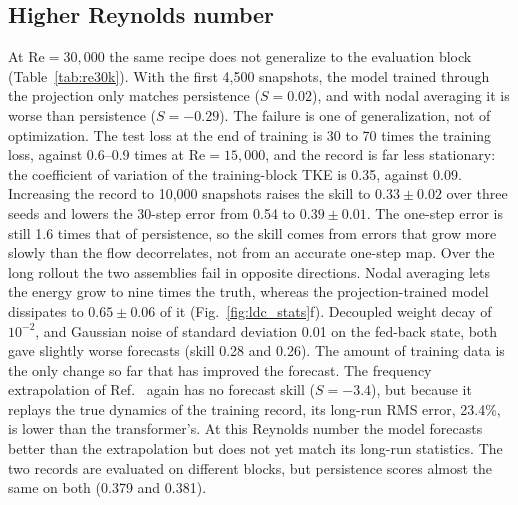 \documentclass[conf]{new-aiaa}
\newcommand{\Rey}{\mathrm{Re}}
\begin{document}
\subsection{Higher Reynolds number}
\label{sec:res_30k}
At $\Rey=30{,}000$ the same recipe does not generalize to the evaluation block (Table~\ref{tab:re30k}). With the first 4,500 snapshots, the model trained through the projection only matches persistence ($S=0.02$), and with nodal averaging it is worse than persistence ($S=-0.29$). The failure is one of generalization, not of optimization. The test loss at the end of training is 30 to 70 times the training loss, against 0.6--0.9 times at $\Rey=15{,}000$, and the record is far less stationary: the coefficient of variation of the training-block TKE is 0.35, against 0.09. Increasing the record to 10,000 snapshots raises the skill to $0.33\pm0.02$ over three seeds and lowers the 30-step error from 0.54 to $0.39\pm0.01$. The one-step error is still 1.6 times that of persistence, so the skill comes from errors that grow more slowly than the flow decorrelates, not from an accurate one-step map. Over the long rollout the two assemblies fail in opposite directions. Nodal averaging lets the energy grow to nine times the truth, whereas the projection-trained model dissipates to $0.65\pm0.06$ of it (Fig.~\ref{fig:ldc_stats}f). Decoupled weight decay \cite{loshchilov2019adamw} of $10^{-2}$, and Gaussian noise of standard deviation 0.01 on the fed-back state, both gave slightly worse forecasts (skill 0.28 and 0.26). The amount of training data is the only change so far that has improved the forecast. The frequency extrapolation of Ref.~\cite{morton2026scitech} again has no forecast skill ($S=-3.4$), but because it replays the true dynamics of the training record, its long-run RMS error, 23.4\%, is lower than the transformer's. At this Reynolds number the model forecasts better than the extrapolation but does not yet match its long-run statistics. The two records are evaluated on different blocks, but persistence scores almost the same on both (0.379 and 0.381).
\end{document}
